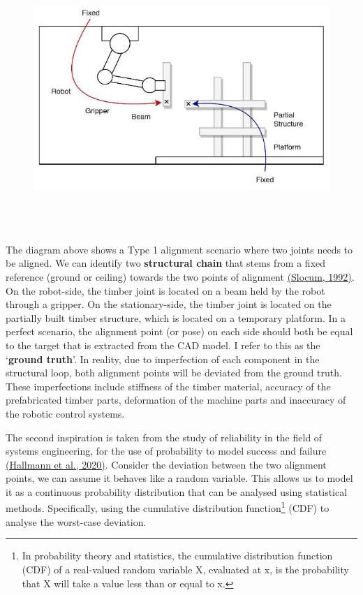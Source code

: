 \documentclass[11pt]{book}
\begin{document}
\begin{figure}[H]
\includegraphics[width=15.92cm,height=9.98cm]{./images/image1.jpeg}
\end{figure}


The diagram above shows a Type 1 alignment scenario where two joints needs to be aligned. We can identify two \textbf{structural chain }that stems from a fixed reference (ground or ceiling) towards the two points of alignment \href{https://www.zotero.org/google-docs/?vXepVQ}{(Slocum, 1992)}. On the robot-side, the timber joint is located on a beam held by the robot through a gripper. On the stationary-side, the timber joint is located on the partially built timber structure, which is located on a temporary platform. In a perfect scenario, the alignment point (or pose) on each side should both be equal to the target that is extracted from the CAD model. I refer to this as the ‘\textbf{ground truth}’. In reality, due to imperfection of each component in the structural loop, both alignment points will be deviated from the ground truth. These imperfections include stiffness of the timber material, accuracy of the prefabricated timber parts, deformation of the machine parts and inaccuracy of the robotic control systems. 

The second inspiration is taken from the study of reliability in the field of systems engineering, for the use of probability to model success and failure \href{https://www.zotero.org/google-docs/?zmsGMJ}{(Hallmann et al., 2020)}.\textit{ }Consider the deviation between the two alignment points, we can assume it behaves like a random variable. This allows us to model it as a continuous probability distribution that can be analysed using statistical methods. Specifically, using the cumulative distribution function\footnote{ In probability theory and statistics, the cumulative distribution function (CDF) of a real-valued random variable X, evaluated at x, is the probability that X will take a value less than or equal to x. } (CDF) to analyse the worst-case deviation.
\end{document}
